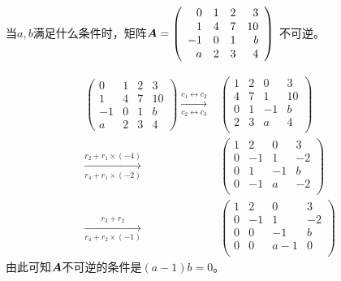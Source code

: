 \begin{li}
  当$a,b$满足什么条件时，矩阵$\boldsymbol{A}=\left(
    \begin{array}{rrrr}
      0&1&2&3\\
      1&4&7&10\\
      -1&0&1&b\\
      a&2&3&4
    \end{array}
  \right)$
  不可逆。
\end{li}




\begin{jie}
$$
\begin{aligned}
  \left(
  \begin{array}{rrrr}
  0&1&2&3\\
  1&4&7&10\\
  -1&0&1&b\\
  a&2&3&4
  \end{array}
  \right)\xrightarrow[c_2\leftrightarrow c_3]{c_1\leftrightarrow c_2} &
  \left(
    \begin{array}{rrrr}
      1 & 2 & 0 & 3\\
      4 & 7 & 1 & 10\\
      0 & 1 & -1 & b\\
      2 & 3 & a & 4\\
    \end{array}
  \right)\\
  \xrightarrow[r_4+r_1\times(-2)]{r_2+r_1\times(-4)}&
  \left(
    \begin{array}{rrrr}
      1 & 2 & 0 & 3\\
      0 & -1 & 1 & -2\\
      0 & 1 & -1 & b\\
      0 & -1 & a & -2\\
    \end{array}
  \right)\\
  \xrightarrow[r_4+r_2\times(-1)]{r_3+r_2}&
  \left(
    \begin{array}{rrrr}      
      1 & 2 & 0 & 3\\
      0 & -1 & 1 & -2\\
      0 & 0 & -1 & b\\
      0 & 0 & a-1 & 0\\
    \end{array}
  \right)
\end{aligned}
$$
由此可知$\boldsymbol{A}$不可逆的条件是$(a-1)b=0$。
\end{jie}


